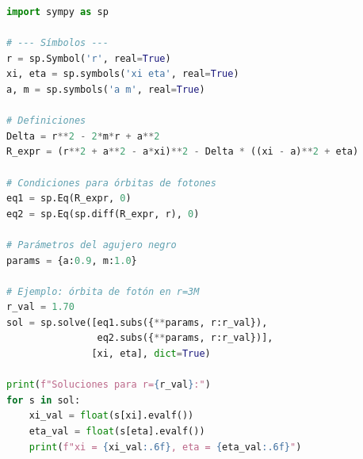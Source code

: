 \begin{lstlisting}[language=Python, caption={Cálculo numérico de las constantes para órbitas circulares de fotones en Kerr}, label={lst:kerr_circular_orbits_photons}]
    import sympy as sp

# --- Símbolos ---
r = sp.Symbol('r', real=True)
xi, eta = sp.symbols('xi eta', real=True)
a, m = sp.symbols('a m', real=True)

# Definiciones
Delta = r**2 - 2*m*r + a**2
R_expr = (r**2 + a**2 - a*xi)**2 - Delta * ((xi - a)**2 + eta)

# Condiciones para órbitas de fotones
eq1 = sp.Eq(R_expr, 0)
eq2 = sp.Eq(sp.diff(R_expr, r), 0)

# Parámetros del agujero negro
params = {a:0.9, m:1.0}

# Ejemplo: órbita de fotón en r=3M
r_val = 1.70
sol = sp.solve([eq1.subs({**params, r:r_val}),
                eq2.subs({**params, r:r_val})],
               [xi, eta], dict=True)

print(f"Soluciones para r={r_val}:")
for s in sol:
    xi_val = float(s[xi].evalf())
    eta_val = float(s[eta].evalf())
    print(f"xi = {xi_val:.6f}, eta = {eta_val:.6f}")
\end{lstlisting}

